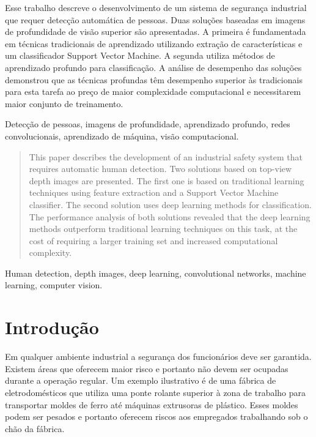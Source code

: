 \begin{resumo}
Esse trabalho descreve o desenvolvimento de um sistema de segurança industrial que requer detecção automática de pessoas. Duas soluções baseadas em imagens de profundidade de visão superior são apresentadas. A primeira é fundamentada em técnicas tradicionais de aprendizado utilizando extração de características e um classificador Support Vector Machine. A segunda utiliza métodos de aprendizado profundo para classificação. A análise de desempenho das soluções demonstrou que as técnicas profundas têm desempenho superior às tradicionais para esta tarefa ao preço de maior complexidade computacional e necessitarem maior conjunto de treinamento.
\end{resumo}

\begin{chave}
Detecção de pessoas, imagens de profundidade, aprendizado profundo, redes convolucionais, aprendizado de máquina, visão computacional.
\end{chave}

\begin{abstract}
This paper describes the development of an industrial safety system that requires automatic human detection. Two solutions based on top-view depth images are presented. The first one is based on traditional learning techniques using feature extraction and a Support Vector Machine classifier. The second solution uses deep learning methods for classification. The performance analysis of both solutions revealed that the deep learning methods outperform traditional learning techniques on this task, at the cost of requiring a larger training set and increased computational complexity.
\end{abstract}

\begin{keywords}
  Human detection, depth images, deep learning, convolutional networks, machine learning, computer vision.
\end{keywords}

\section{Introdução}
  Em qualquer ambiente industrial a segurança dos funcionários deve ser garantida. Existem áreas que oferecem maior risco e portanto não devem ser ocupadas durante a operação regular. Um exemplo ilustrativo é de uma fábrica de eletrodomésticos que utiliza uma ponte rolante superior à zona de trabalho para transportar moldes de ferro até máquinas extrusoras de plástico. Esses moldes podem ser pesados e portanto oferecem riscos aos empregados trabalhando sob o chão da fábrica.

